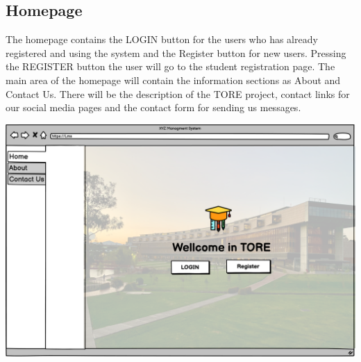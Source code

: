 \subsection{Homepage}
The homepage contains the LOGIN button for the users who has already registered and using the system and the Register button for new users. Pressing the REGISTER button the user will go to the student registration page. The main area of the homepage will contain the information sections as About and Contact Us. There will be the description of the TORE project, contact links for our social media pages and the contact form for sending us messages.   

\includegraphics[width=\columnwidth]{images/HomePage.png}